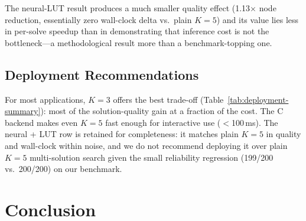 \documentclass[graybox]{svmult}
\begin{document}
The neural-LUT result produces a much smaller quality effect (1.13$\times$ node reduction, essentially zero wall-clock delta vs.\ plain $K{=}5$) and its value lies less in per-solve speedup than in demonstrating that inference cost is not the bottleneck---a methodological result more than a benchmark-topping one.

\subsection{Deployment Recommendations}

\begin{table}[!t]
\centering
\caption{Recommended settings for different use cases.}
\label{tab:deployment-summary}
\end{table}

For most applications, $K{=}3$ offers the best trade-off (Table~\ref{tab:deployment-summary}): most of the solution-quality gain at a fraction of the cost. The C backend makes even $K{=}5$ fast enough for interactive use ($<$100\,ms). The neural + LUT row is retained for completeness: it matches plain $K{=}5$ in quality and wall-clock within noise, and we do not recommend deploying it over plain $K{=}5$ multi-solution search given the small reliability regression (199/200 vs.\ 200/200) on our benchmark.

\section{Conclusion}
\label{sec:conclusion}
\end{document}
